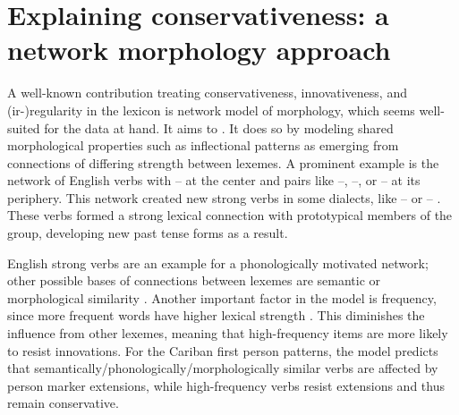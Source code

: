 \section{Explaining conservativeness: a network morphology approach}
\label{sec:motivations}
A well-known contribution treating conservativeness, innovativeness, and (ir-){}re\-gu\-la\-ri\-ty in the lexicon is  network model of morphology, which seems well-suited for the data at hand.
It aims to  \parencite[428]{bybee1995regular}.
It does so by modeling shared morphological properties such as inflectional patterns as emerging from connections of differing strength between lexemes.
A prominent example is the network of  English verbs with -- at the center and pairs like --, --, or -- at its periphery.
This network created new strong verbs in some dialects, like -- or -- \parencite[129--130]{bybee1985morphology}.
These verbs formed a strong lexical connection with prototypical members of the group, developing new past tense forms as a result.

English strong verbs are an example for a phonologically motivated network; other possible bases of connections between lexemes are semantic or morphological similarity \parencite[118]{bybee1985morphology}.
Another important factor in the model is frequency, since more frequent words have higher lexical strength \parencite[119]{bybee1985morphology}.
This diminishes the influence from other lexemes, meaning that high-frequency items are more likely to resist innovations.
For the Cariban first person patterns, the model predicts that semantically\slash{}phonologically\slash\hspace{0pt}morphologically similar verbs are affected by person marker extensions, while high-frequency verbs resist extensions and thus remain conservative.

